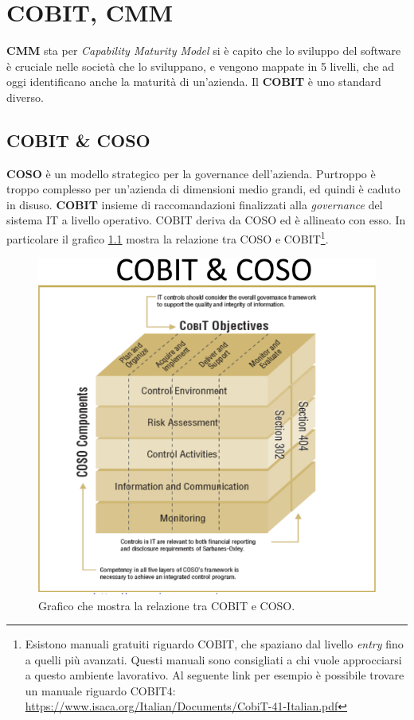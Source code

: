 \chapter{COBIT, CMM}

\textbf{CMM} sta per \textit{Capability Maturity Model} si è capito che lo 
sviluppo del software è cruciale nelle società che lo sviluppano, e vengono 
mappate in 5 livelli, che ad oggi identificano anche la maturità di un'azienda. 
Il \textbf{COBIT} è uno standard diverso.

\section{COBIT \& COSO}

\textbf{COSO} è un modello strategico per la governance dell'azienda. Purtroppo 
è troppo complesso per un'azienda di dimensioni medio grandi, ed quindi è caduto 
in disuso.
\textbf{COBIT} insieme di raccomandazioni finalizzati alla \textit{governance} 
del sistema IT a livello operativo.
COBIT deriva da COSO ed è allineato con esso. In particolare il grafico
\ref{fig:cobit:coso:relazione} mostra la relazione tra COSO e COBIT\footnote{Esistono manuali gratuiti 
riguardo COBIT, che spaziano dal livello \textit{entry} fino a quelli più 
avanzati. Questi manuali sono consigliati a chi vuole approcciarsi a questo ambiente 
lavorativo. Al seguente link per esempio è possibile trovare un manuale riguardo 
COBIT4:  \url{https://www.isaca.org/Italian/Documents/CobiT-41-Italian.pdf}}.
\begin{figure}[H!]
        \begin{center}
                \includegraphics[scale=2.0]{res/img/cobit_coso_cube}
        \end{center}
        \caption{Grafico che mostra la relazione tra COBIT e COSO.}
        \label{fig:cobit:coso:relazione}
\end{figure}

